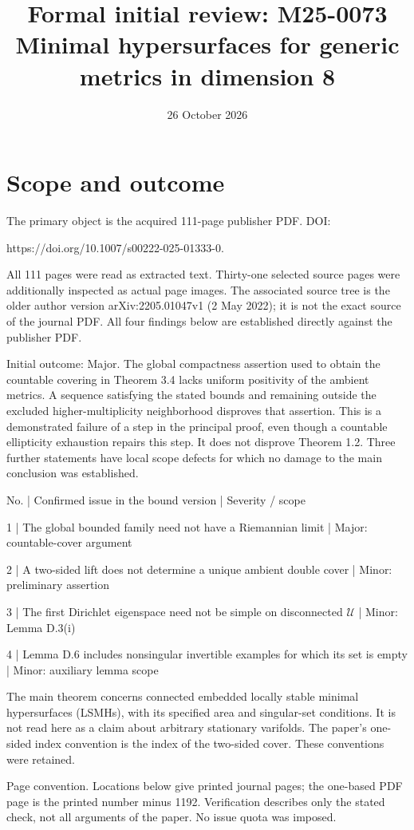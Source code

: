 \documentclass[10pt]{article}
\title{Formal initial review: M25-0073
Minimal hypersurfaces for generic metrics in dimension 8}
\author{}
\date{26 October 2026}
\begin{document}
\maketitle
\section*{Scope and outcome}
The primary object is the acquired 111-page publisher PDF. DOI:\par
https://doi.org/10.1007/s00222-025-01333-0.\par
All 111 pages were read as extracted text. Thirty-one selected source pages were additionally inspected as actual page images. The associated source tree is the older author version arXiv:2205.01047v1 (2 May 2022); it is not the exact source of the journal PDF. All four findings below are established directly against the publisher PDF.\par
Initial outcome: Major. The global compactness assertion used to obtain the countable covering in Theorem 3.4 lacks uniform positivity of the ambient metrics. A sequence satisfying the stated bounds and remaining outside the excluded higher-multiplicity neighborhood disproves that assertion. This is a demonstrated failure of a step in the principal proof, even though a countable ellipticity exhaustion repairs this step. It does not disprove Theorem 1.2. Three further statements have local scope defects for which no damage to the main conclusion was established.\par
No. | Confirmed issue in the bound version | Severity / scope\par
1 | The global bounded family need not have a Riemannian limit | Major: countable-cover argument\par
2 | A two-sided lift does not determine a unique ambient double cover | Minor: preliminary assertion\par
3 | The first Dirichlet eigenspace need not be simple on disconnected \(\mathcal U\) | Minor: Lemma D.3(i)\par
4 | Lemma D.6 includes nonsingular invertible examples for which its set is empty | Minor: auxiliary lemma scope\par
The main theorem concerns connected embedded locally stable minimal hypersurfaces (LSMHs), with its specified area and singular-set conditions. It is not read here as a claim about arbitrary stationary varifolds. The paper’s one-sided index convention is the index of the two-sided cover. These conventions were retained.\par
Page convention. Locations below give printed journal pages; the one-based PDF page is the printed number minus 1192. Verification describes only the stated check, not all arguments of the paper. No issue quota was imposed.\par
\end{document}
